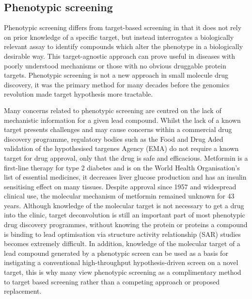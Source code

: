 \documentclass[a4paper,11pt,twoside,openright]{scrbook}
\begin{document}

\subsection{Phenotypic screening}
Phenotypic screening differs from target-based screening in that it does not rely on prior knowledge of a specific target, but instead interrogates a biologically relevant assay to identify compounds which alter the phenotype in a biologically desirable way.
This target-agnostic approach can prove useful in diseases with poorly understood mechanisms or those with no obvious druggable protein targets.
Phenotypic screening is not a new approach in small molecule drug discovery, it was the primary method for many decades before the genomics revolution made target hypothesis more tractable.
\cite{Zheng2013}


Many concerns related to phenotypic screening are centred on the lack of mechanistic information for a given lead compound.
Whilst the lack of a known target presents challenges and may cause concerns within a commercial drug discovery programme, regulatory bodies such as the Food and Drug Aded validation of the hypothesised targenes Agency (EMA) do not require a known target for drug approval, only that the drug is safe and efficacious.
Metformin is a first-line therapy for type 2 diabetes and is on the World Health Organisation's list of essential medicines, it decreases liver glucose production and has an insulin sensitising effect on many tissues.
Despite approval since 1957 and widespread clinical use, the  molecular mechanism of metformin remained unknown for 43 years. \cite{Hundal2000}
Although knowledge of the molecular target is not necessary to get a drug into the clinic, target deconvolution is still an important part of most phenotypic drug discovery programmes, without knowing the protein or proteins a compound is binding to lead optimisation via structure activity relationship (SAR) studies becomes extremely difficult.
In addition, knowledge of the molecular target of a lead compound generated by a phenotypic screen can be used as a basis for instigating a conventional high-throughput hypothesis-driven screen on a novel target, this is why many view phenotypic screening as a complimentary method to target based screening rather than a competing approach or proposed replacement. \cite{Moffat2014}
\end{document}
